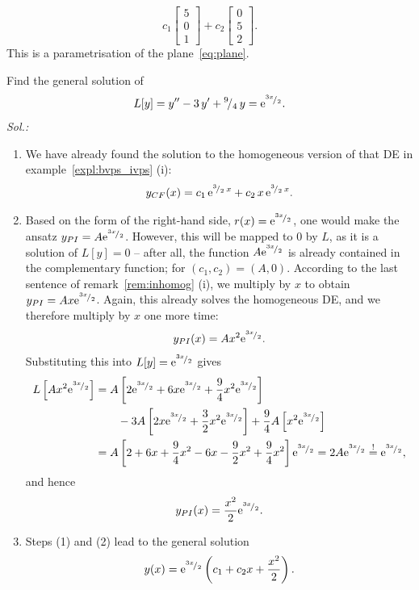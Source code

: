 \begin{remark}
\begin{enumerate}[(i)]
\begin{enumerate}[(1)]
\[				c_1 \begin{bmatrix} 5 \\ 0 \\ 1\end{bmatrix}
		+ c_2 \begin{bmatrix} 0 \\ 5 \\ 2\end{bmatrix}. \]
		This is a parametrisation of the plane~\eqref{eq:plane}.
\end{enumerate} 
\end{enumerate}
\end{remark}

\begin{example}
Find the general solution of 
\[ L[y] = y''-3\,y'+{}^{9}\!/_{4}\,y = \mathrm{e}^{{}^{3x}\!/_{2}}. \]
{\it Sol.:}
\begin{enumerate}[(1)]
	\item We have already found the solution to the homogeneous version of that DE in example~\ref{expl:bvps_ivps} (i):
	\[ y_{CF}(x) = c_1\,\mathrm{e}^{{}^{3}\!/_{2}\,x} + c_2\,x\,\mathrm{e}^{{}^{3}\!/_{2}\,x}. \]
	\item Based on the form of the right-hand side, $r(x)=\mathrm{e}^{{}^{3x}\!/_{2}}$, one would make the ansatz $y_{PI}=A\mathrm{e}^{{}^{3x}\!/_{2}}$. However, this will be mapped to $0$ by $L$, as it is a solution of $L[y]=0$ -- after all, the function $A\mathrm{e}^{{}^{3x}\!/_{2}}$ is already contained in the complementary function; for $(c_1,c_2)=(A,0)$. According to the last sentence of remark~\ref{rem:inhomog} (i), we multiply by $x$ to obtain $y_{PI}=Ax\mathrm{e}^{{}^{3x}\!/_{2}}$. Again, this already solves the homogeneous DE, and we therefore multiply by $x$ one more time:
	\[ y_{PI}(x)=Ax^2\mathrm{e}^{{}^{3x}\!/_{2}}. \]
	Substituting this into $L[y]=\mathrm{e}^{{}^{3x}\!/_{2}}$ gives
	\begin{equation*}
	\begin{split}
	 L\left[ Ax^2\e^{\rfrac{3x}{2}} \right] 
	 &= A\left[ 2\e^{\rfrac{3x}{2}} + 6x\e^{\rfrac{3x}{2}} 
	 + \frac{9}{4}x^2\e^{\rfrac{3x}{2}} \right] \\
	 & \qquad -3A\left[ 2x\e^{\rfrac{3x}{2}} + \frac{3}{2}x^2\e^{\rfrac{3x}{2}} \right]
	 +\frac{9}{4}A\left[ x^2\e^{\rfrac{3x}{2}} \right] \\
	 & = A \left[ 2 + 6x + \frac94x^2 - 6x -\frac92x^2 + \frac94x^2  \right] \e^{\rfrac{3x}{2}}
	 =2A\e^{\rfrac{3x}{2}} \stackrel{!}{=} \e^{\rfrac{3x}{2}},
	\end{split}
	\end{equation*}
	and hence
	\[ y_{PI}(x)=\frac{x^2}{2}\mathrm{e}^{{}^{3x}\!/_{2}}. \]
	\item Steps (1) and (2) lead to the general solution
	\[ y(x) = \mathrm{e}^{{}^{3x}\!/_{2}}\left( c_1+c_2x+\frac{x^2}{2} \right). \]
\end{enumerate}
\end{example}

